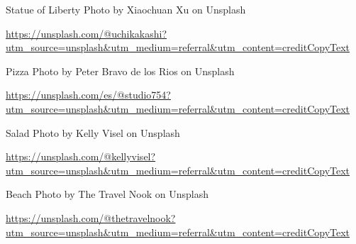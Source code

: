 \documentclass[12pt,twoside,openright]{memoir}
\begin{document}
Statue of Liberty Photo by Xiaochuan Xu on Unsplash

\href{https://unsplash.com/@uchikakashi?utm_source=unsplash&utm_medium=referral&utm_content=creditCopyText}{\url{https://unsplash.com/@uchikakashi?utm_source=unsplash&utm_medium=referral&utm_content=creditCopyText}}

Pizza Photo by Peter Bravo de los Rios on Unsplash

\href{https://unsplash.com/es/@studio754?utm_source=unsplash&utm_medium=referral&utm_content=creditCopyText}{\url{https://unsplash.com/es/@studio754?utm_source=unsplash&utm_medium=referral&utm_content=creditCopyText}}

Salad Photo by Kelly Visel on Unsplash

\href{https://unsplash.com/@kellyvisel?utm_source=unsplash&utm_medium=referral&utm_content=creditCopyText}{\url{https://unsplash.com/@kellyvisel?utm_source=unsplash&utm_medium=referral&utm_content=creditCopyText}}


Beach Photo by The Travel Nook on Unsplash

\href{https://unsplash.com/@thetravelnook?utm_source=unsplash&utm_medium=referral&utm_content=creditCopyText}{\url{https://unsplash.com/@thetravelnook?utm_source=unsplash&utm_medium=referral&utm_content=creditCopyText}}
\end{document}

